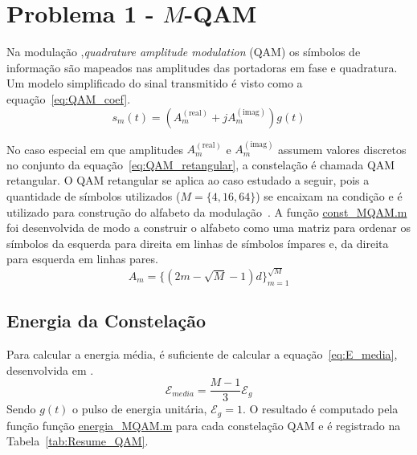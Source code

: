 \section{Problema 1 - \texorpdfstring{$M$}{M}-QAM}

Na modulação ,\textit{quadrature amplitude modulation} (QAM) os símbolos de informação são mapeados nas amplitudes das portadoras em fase e quadratura. Um modelo simplificado do sinal transmitido é visto como a equação~\ref{eq:QAM_coef}.
\begin{equation}
    s_m(t) = ( A_m^{(\text{real})} + j A_m^{(\text{imag})}) g(t)
    \label{eq:QAM_coef}
\end{equation}

No caso especial em que amplitudes $A_m^{(\text{real})}$ e $A_m^{(\text{imag})}$ assumem valores discretos no conjunto da equação~\ref{eq:QAM_retangular}, a constelação é chamada QAM retangular. O QAM retangular se aplica ao caso estudado a seguir, pois a quantidade de símbolos utilizados ($M = \{4, 16, 64\}$) se encaixam na condição e é utilizado para construção do alfabeto da modulação~\cite{Cecilio}. A função \href{https://raw.githubusercontent.com/lucasabdalah/Courses-HWs/SCD/Sistemas%20de%20Comunicacoes%20Digitais/matlab/problema1/const_MQAM.m}{const\_MQAM.m} foi desenvolvida de modo a construir o alfabeto como uma matriz para ordenar os símbolos da esquerda para direita em linhas de símbolos ímpares e, da direita para esquerda em linhas pares.
\begin{equation}
    A_m = \{(2m -\sqrt{M} - 1)d \}_{m=1}^{\sqrt{M}}
    \label{eq:QAM_retangular}
\end{equation}

\subsection{Energia da Constelação} 
Para calcular a energia média, é suficiente de calcular a equação~\ref{eq:E_media}, desenvolvida em \cite{Cecilio,Proakis}.
\begin{equation}
    \mathcal{E}_{media} = \frac{M-1}{3} \mathcal{E}_g
    \label{eq:E_media}
\end{equation}
Sendo $g(t)$ o pulso de energia unitária, $\mathcal{E}_g = 1$. O resultado é computado pela função função \href{https://raw.githubusercontent.com/lucasabdalah/Courses-HWs/SCD/Sistemas%20de%20Comunicacoes%20Digitais/matlab/problema1/energia_MQAM.m}{energia\_MQAM.m} para cada constelação QAM e é registrado na Tabela~\ref{tab:Resume_QAM}.

